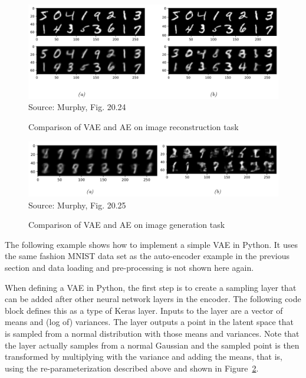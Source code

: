 \begin{figure}
\begin{center}
\includegraphics[width=\textwidth]{murphy_20_24.png}\\

\scriptsize Source: Murphy, Fig. 20.24 \normalsize
\end{center}
\caption{Comparison of VAE and AE on image reconstruction task}
\label{fig:murphy_20_24}
\end{figure}

\begin{figure}
\begin{center}
\includegraphics[width=\textwidth]{murphy_20_25.png}\\

\scriptsize Source: Murphy, Fig. 20.25 \normalsize
\end{center}
\caption{Comparison of VAE and AE on image generation task}
\label{fig:murphy_20_25}
\end{figure}

The following example shows how to implement a simple VAE in Python. It uses the same fashion MNIST data set as the auto-encoder example in the previous section and data loading and pre-processing is not shown here again. 

When defining a VAE in Python, the first step is to create a sampling layer that can be added after other neural network layers in the encoder. The following code block defines this as a type of Keras layer. Inputs to the layer are a vector of means and (log of) variances. The layer outputs a point in the latent space that is sampled from a normal distribution with those means and variances. Note that the layer actually samples from a normal Gaussian and the sampled point is then transformed by multiplying with the variance and adding the means, that is, using the re-parameterization described above and shown in Figure~\ref{fig:murphy_20_25}.


